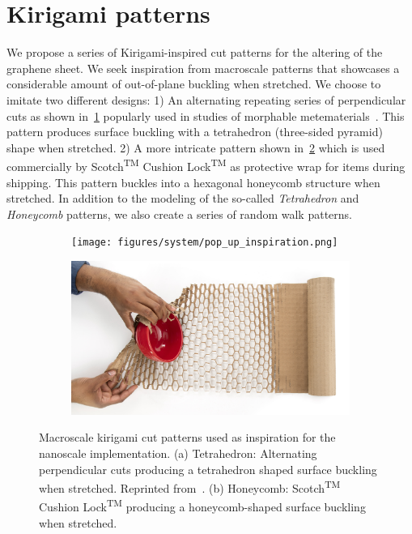 \section{Kirigami patterns}
We propose a series of Kirigami-inspired cut patterns for the altering of the graphene sheet. We seek inspiration from macroscale patterns that showcases a considerable amount of out-of-plane buckling when stretched. We choose to imitate two different designs: 1) An alternating repeating series of perpendicular cuts as shown in~\cref{fig:kirigami_inspiration_a} popularly used in studies of morphable metematerials~\cite{new_pop_up}. This pattern produces surface buckling with a tetrahedron (three-sided pyramid) shape when stretched. 2) A more intricate pattern shown in~\cref{fig:kirigami_inspiration_b} which is used commercially by Scotch\textsuperscript{TM} Cushion Lock\textsuperscript{TM} \cite{cushion_wrap} as protective wrap for items during shipping. This pattern buckles into a hexagonal honeycomb structure when stretched. In addition to the modeling of the so-called \textit{Tetrahedron} and \textit{Honeycomb} patterns, we also create a series of random walk patterns.

\begin{figure}[h]
  \centering
  \begin{subfigure}[t]{0.48\textwidth}
      \centering
      \texttt{[image: figures/system/pop\_up\_inspiration.png]}
      \caption{}
      \label{fig:kirigami_inspiration_a}
    \end{subfigure}
    \hfill
    \begin{subfigure}[t]{0.48\textwidth}
      \centering
      \includegraphics[width=\textwidth]{figures/system/honeycomb_inspiration.jpg}
      \caption{}
      \label{fig:kirigami_inspiration_b}
  \end{subfigure}
  \hfill
     \caption{Macroscale kirigami cut patterns used as inspiration for the nanoscale implementation. (a) Tetrahedron: Alternating perpendicular cuts producing a tetrahedron shaped surface buckling when stretched. Reprinted from~\cite{new_pop_up}. (b) Honeycomb: Scotch\textsuperscript{TM} Cushion Lock\textsuperscript{TM} \cite{cushion_wrap} producing a honeycomb-shaped surface buckling when stretched.}
     \label{fig:kirigami_inspiration}
\end{figure}

